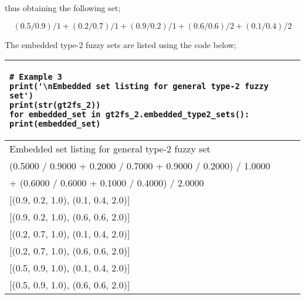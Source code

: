 \documentclass[]{article}
\begin{document}
thus obtaining the following set;

\[
(0.5/0.9)/1 + (0.2/0.7)/1 + (0.9/0.2)/1 + (0.6/0.6)/2 + (0.1/0.4)/2
\]

The embedded type-2 fuzzy sets are listed using the code below;

\bigskip

\begin{tabular}{|l|}
	\hline 
	\lstset{language=Python}
	\lstset{basicstyle=\scriptsize}
	\begin{lstlisting}
# Example 3
print('\nEmbedded set listing for general type-2 fuzzy set')
print(str(gt2fs_2))
for embedded_set in gt2fs_2.embedded_type2_sets():
print(embedded_set)
	\end{lstlisting}
	\\
	\hline
{\small Embedded set listing for general type-2 fuzzy set}\\
{\small (0.5000 / 0.9000 + 0.2000 / 0.7000 + 0.9000 / 0.2000) / 1.0000 }\\
{\small + (0.6000 / 0.6000 + 0.1000 / 0.4000) / 2.0000}\\
{\small [(0.9, 0.2, 1.0), (0.1, 0.4, 2.0)]}\\
{\small [(0.9, 0.2, 1.0), (0.6, 0.6, 2.0)]}\\
{\small [(0.2, 0.7, 1.0), (0.1, 0.4, 2.0)]}\\
{\small [(0.2, 0.7, 1.0), (0.6, 0.6, 2.0)]}\\
{\small [(0.5, 0.9, 1.0), (0.1, 0.4, 2.0)]}\\
{\small [(0.5, 0.9, 1.0), (0.6, 0.6, 2.0)]}\\
	\hline 
\end{tabular} 
\end{document}

